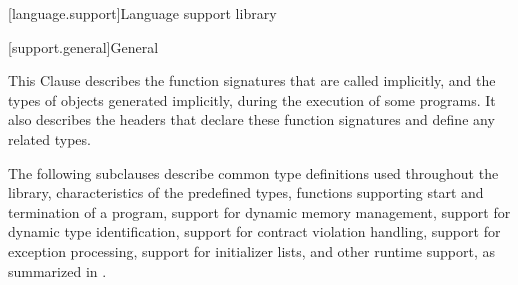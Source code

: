 [language.support]{Language support library}

[support.general]{General}

\pnum
This Clause describes the function signatures that are called
implicitly, and the types of objects generated implicitly, during the execution
of some \Cpp{} programs.
It also describes the headers that declare these function
signatures and define any related types.

\pnum
The following subclauses describe
common type definitions used throughout the library,
characteristics of the predefined types,
functions supporting start and termination of a \Cpp{} program,
support for dynamic memory management,
support for dynamic type identification,
support for contract violation handling,
support for exception processing, support for initializer lists,
and other runtime support,
as summarized in .

